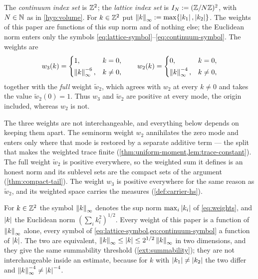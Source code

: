 \begin{definition}\label{def:modes}
The \emph{continuum index set} is $\mathbb{Z}^2$; the \emph{lattice index set} is
$I_N:=(\mathbb{Z}/N\mathbb{Z})^2$, with $N\in\mathbb{N}$ as in \cref{hyp:volume}. For $k\in\mathbb{Z}^2$ put
$\left\| k \right\|_\infty:=\max\{\left| k_1 \right|,\left| k_2 \right|\}$. The weights of this paper are
functions of this sup norm and of nothing else; the Euclidean norm enters only
the symbols \eqref{eq:lattice-symbol}--\eqref{eq:continuum-symbol}. The weights
are
\begin{equation}\label{eq:weights}
  w_3(k)=
  \begin{cases}
    1, & k=0,\\[2pt]
    \left\| k \right\|_\infty^{-6}, & k\neq0,
  \end{cases}
  \qquad
  w_2(k)=
  \begin{cases}
    0, & k=0,\\[2pt]
    \left\| k \right\|_\infty^{-4}, & k\neq0,
  \end{cases}
\end{equation}
together with the \emph{full} weight $\widetilde w_2$, which agrees with $w_2$
at every $k\neq0$ and takes the value $\widetilde w_2(0)=1$. Thus $w_3$ and
$\widetilde w_2$ are positive at every mode, the origin included, whereas $w_2$
is not.
\end{definition}

The three weights are not interchangeable, and everything below depends on
keeping them apart. The seminorm weight $w_2$ annihilates the zero mode and
enters only where that mode is restored by a separate additive term --- the split
that makes the weighted trace finite
(\cref{thm:uniform-moment,lem:trace-constant}). The full
weight $\widetilde w_2$ is positive everywhere, so the weighted sum it defines
is an honest norm and its sublevel sets are the compact sets of the argument
(\cref{thm:compact-tail}). The weight $w_3$ is positive everywhere for the same
reason as $\widetilde w_2$, and its weighted space carries the measures
(\cref{def:carrier-hs}).

\begin{definition}\label{def:weight-supnorm}
For $k\in\mathbb{Z}^2$ the symbol $\left\| k \right\|_\infty$ denotes the sup norm
$\max_i\left| k_i \right|$ of \eqref{eq:weights}, and $\left| k \right|$ the Euclidean norm
$(\sum_ik_i^2)^{1/2}$. Every weight of this paper is a function of
$\left\| k \right\|_\infty$ alone, every symbol of
\cref{eq:lattice-symbol,eq:continuum-symbol} a function of $\left| k \right|$. The two
are equivalent, $\left\| k \right\|_\infty\le\left| k \right|\le 2^{1/2}\left\| k \right\|_\infty$ in two
dimensions, and they give the same summability threshold
(\cref{ext:summability}); they are not interchangeable inside an estimate,
because for $k$ with $\left| k_1 \right|\neq\left| k_2 \right|$ the two differ and
$\left\| k \right\|_\infty^{-4}\neq\left| k \right|^{-4}$.
\end{definition}


